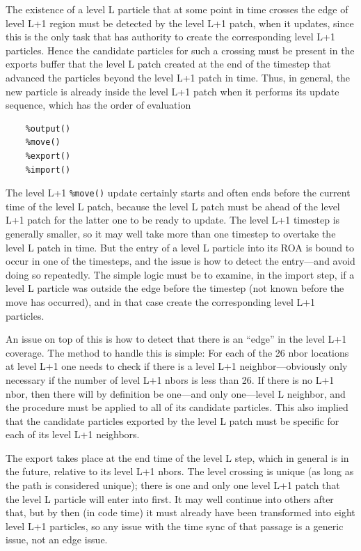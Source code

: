 \documentclass[paper=a4,fontsize=11pt]{scrartcl}
\numberwithin{equation}{section}		%
\numberwithin{figure}{section}			%
\numberwithin{table}{section}				%
\newcommand{\codecolor}{\color{Blue}}
\newcommand{\Code}[1]{{\codecolor\texttt{#1}}}
\begin{document}
The existence of a level L particle that at some point in time crosses the edge of level L+1 region must be detected by the level L+1 patch, when it updates, since this is the only task that has authority to create the corresponding level L+1 particles.  Hence the candidate particles for such a crossing must be present in the exports buffer that the level L patch created at the end of the timestep that advanced the particles beyond the level L+1 patch in time.  Thus, in general, the new particle is already inside the level L+1 patch when it performs its update sequence, which has the order of evaluation
{\small\codecolor\begin{verbatim}
    %output()
    %move()
    %export()
    %import()
\end{verbatim}}
The level L+1 \Code{\%move()} update certainly starts and often ends before the current time of the level L patch, because the level L patch must be ahead of the level L+1 patch for the latter one to be ready to update.  The level L+1 timestep is generally smaller, so it may well take more than one timestep to overtake the level L patch in time.  But the entry of a level L particle into its ROA is bound to occur in one of the timesteps, and the issue is how to detect the entry---and avoid doing so repeatedly. The simple logic must be to examine, in the import step, if a level L particle was outside the edge before the timestep (not known before the move has occurred), and in that case create the corresponding level L+1 particles. 

An issue on top of this is how to detect that there is an ``edge'' in the level L+1 coverage.  The method to handle this is simple: For each of the 26 nbor locations at level L+1 one needs to check if there is a level L+1 neighbor---obviously only necessary if the number of level L+1 nbors is less than 26.  If there is no L+1 nbor, then there will by definition be one---and only one---level L neighbor, and the procedure must be applied to all of its candidate particles.  This also implied that the candidate particles exported by the level L patch must be specific for each of its level L+1 neighbors.

The export takes place at the end time of the level L step, which in general is in the future, relative to its level L+1 nbors.  The level crossing is unique (as long as the path is considered unique); there is one and only one level L+1 patch that the level L particle will enter into first.  It may well continue into others after that, but by then (in code time) it must already have been transformed into eight level L+1 particles, so any issue with the time sync of that passage is a generic issue, not an edge issue.
\end{document}
